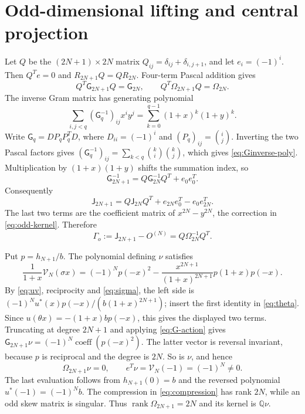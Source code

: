 \documentclass[11pt,a4paper]{amsart}
\theoremstyle{remark}\newtheorem{remark}[theorem]{Remark}
\numberwithin{equation}{section}
\DeclareMathOperator{\rank}{rank}
\newcommand{\Q}{\mathbb Q}
\newcommand{\G}{\mathsf G}
\newcommand{\J}{\mathsf J}
\begin{document}
\section{Odd-dimensional lifting and central projection}\label{sec:odd}
Let $Q$ be the $(2N+1)\times2N$ matrix $Q_{ij}=\delta_{ij}+\delta_{i,j+1}$, and let $e_i=(-1)^i$. Then $Q^Te=0$ and $R_{2N+1}Q=QR_{2N}$. Four-term Pascal addition gives
\begin{equation}\label{eq:compression}
 Q^T\G_{2N+1}Q=\G_{2N},\qquad Q^T\Omega_{2N+1}Q=\Omega_{2N}.
\end{equation}
The inverse Gram matrix has generating polynomial
\begin{equation}\label{eq:Ginverse-poly}
 \sum_{i,j<q}(\G_q^{-1})_{ij}x^iy^j=\sum_{k=0}^{q-1}(1+x)^k(1+y)^k.
\end{equation}
Write $\G_q=DP_qP_q^TD$, where $D_{ii}=(-1)^i$ and $(P_q)_{ij}=\binom ij$. Inverting the two Pascal factors gives $(\G_q^{-1})_{ij}=\sum_{k<q}\binom ki\binom kj$, which gives \eqref{eq:Ginverse-poly}. Multiplication by $(1+x)(1+y)$ shifts the summation index, so
\begin{equation}\label{eq:G-lift}
 \G_{2N+1}^{-1}=Q\G_{2N}^{-1}Q^T+e_0e_0^T.
\end{equation}
Consequently
\[
 \J_{2N+1}=Q\J_{2N}Q^T+e_{2N}e_0^T-e_0e_{2N}^T.
\]
The last two terms are the coefficient matrix of $x^{2N}-y^{2N}$, the correction in \eqref{eq:odd-kernel}. Therefore
\begin{equation}\label{eq:gammaOdd}
 \Gamma_o:=\J_{2N+1}-O^{(N)}=Q\Omega_{2N}^{-1}Q^T.
\end{equation}

Put $p=h_{N+1}/b$. The polynomial defining $\nu$ satisfies
\begin{equation}\label{eq:nu-transform}
 \frac1{1+x}\mathscr V_N(\sigma x)
 =(-1)^Np(-x)^2-
 \frac{x^{2N+1}}{(1+x)^{2N+1}}p(1+x)p(-x).
\end{equation}
By \eqref{eq:uv}, reciprocity and \eqref{eq:sigma}, the left side is
$(-1)^Nu^*(x)p(-x)/(b(1+x)^{2N+1})$; insert the first identity in \eqref{eq:theta}. Since $u(\theta x)=-(1+x)bp(-x)$, this gives the displayed two terms.
Truncating at degree $2N+1$ and applying \eqref{eq:G-action} gives $\G_{2N+1}\nu=(-1)^N\operatorname{coeff}(p(-x)^2)$. The latter vector is reversal invariant, because $p$ is reciprocal and the degree is $2N$. So is $\nu$, and hence
\begin{equation}\label{eq:nu-null}
 \Omega_{2N+1}\nu=0,\qquad e^T\nu=\mathscr V_N(-1)=(-1)^N\ne0.
\end{equation}
The last evaluation follows from $h_{N+1}(0)=b$ and the reversed polynomial $u^*(-1)=(-1)^Nb$.
The compression in \eqref{eq:compression} has rank $2N$, while an odd skew matrix is singular. Thus $\rank\Omega_{2N+1}=2N$ and its kernel is $\Q\nu$.
\end{document}
